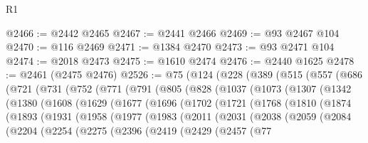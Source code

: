 \begin{lexlean}{R1}
\begin{coremodule}
@2466 := @2442 @2465
@2467 := @2441 @2466
@2469 := @93 @2467 @104
@2470 := @116 @2469
@2471 := @1384 @2470
@2473 := @93 @2471 @104
@2474 := @2018 @2473
@2475 := @1610 @2474
@2476 := @2440 @1625
@2478 := @2461 (@2475 @2476)
@2526 := @75
    (@124
      (@228
        (@389
          (@515
            (@557
              (@686
                (@721
                  (@731
                    (@752
                      (@771
                        (@791
                          (@805
                            (@828
                              (@1037
                                (@1073
                                  (@1307
                                    (@1342
                                      (@1380
                                        (@1608
                                          (@1629
                                            (@1677
                                              (@1696
                                                (@1702
                                                  (@1721
                                                    (@1768
                                                      (@1810
                                                        (@1874
                                                          (@1893
                                                            (@1931
                                                              (@1958
                                                                (@1977
                                                                  (@1983
                                                                    (@2011
                                                                      (@2031
                                                                        (@2038
                                                                          (@2059
                                                                            (@2084
                                                                              (@2204
                                                                                (@2254
                                                                                  (@2275
                                                                                    (@2396
                                                                                      (@2419
                                                                                        (@2429
                                                                                          (@2457
                                                                                            (@77

\end{coremodule}
\end{lexlean}
